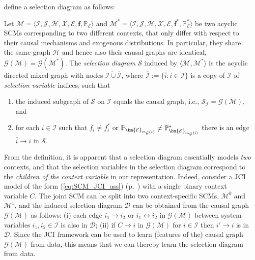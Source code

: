 \documentclass[twoside,11pt]{article}
\newcommand{\Prb}{\mathbb{P}}
\newcommand\B[1]{\bm{#1}}
\newcommand\C[1]{\mathcal{#1}}
\newcommand\BC[1]{\bm{\mathcal{#1}}}
\newcommand\mathbfsc[1]{\text{\normalfont\scshape#1}}
\newcommand\pasub[2]{\mathbfsc{pa}_{#1}(#2)}
\newcommand\eref[1]{(\ref{#1})}
\newcommand{\oto}{\leftrightarrow}
\newcommand{\Joris}[1]{{\color{blue}#1}}
\newcommand{\Tom}[1] {{\color{green}#1}}
\begin{document}
\citet{BareinboimPearl2013} define a selection diagram as follows:
\begin{definition}
Let $\C{M} = \langle \C{I}, \C{J}, \C{H}, \BC{X}, \BC{E}, \B{f}, \Prb_{\BC{E}} \rangle$ and
$\C{M}^* = \langle \C{I}, \C{J}, \C{H}, \BC{X}, \BC{E}, \B{f}^*, \Prb^*_{\BC{E}} \rangle$ be
two acyclic SCMs corresponding to two different contexts, that only differ with respect to their
causal mechanisms and exogenous distributions. In particular, they share the same 
graph $\C{H}$ and hence also their causal graphs are identical, $\C{G}(\C{M}) = \C{G}(\C{M}^*)$. 
The \emph{selection diagram} $\C{S}$ induced by $\langle \C{M}, \C{M}^*\rangle$ 
is the acyclic directed mixed graph with nodes $\C{I} \dot\cup \overline{\C{I}}$, where 
$\overline{\C{I}} := \{\bar{i} : i \in \C{I}\}$ is a copy of $\C{I}$ of \emph{selection variable} indices, such that
  \begin{enumerate}
    \item the induced subgraph of $\C{S}$ on $\C{I}$ equals the causal graph, i.e., $\C{S}_{\C{I}} = \C{G}(\C{M})$, and
    \item for each $i\in \C{I}$ such that $f_i \ne f_i^*$ or $\Prb_{\BC{E}_{\pasub{\C{G}}{i}}} \ne \Prb^*_{\BC{E}_{\pasub{\C{G}}{i}}}$ there is an edge $\bar{i} \to i$ in $\C{S}$.
  \end{enumerate}
\end{definition}

From the definition, it is apparent that a selection diagram essentially models \emph{two} contexts, and
that the selection variables in the selection diagram correspond to the \emph{children of the context variable}
in our representation.
Indeed, consider a JCI model of the form \eref{eq:SCM_JCI_ass} (p.\ \pageref{eq:SCM_JCI_ass}) with a single binary context variable $C$. The
joint SCM can be split into two context-specific SCMs, $\C{M}^0$ and $\C{M}^1$, and the induced 
selection diagram $\C{D}$ can be obtained from the causal graph $\C{G}(\C{M})$ as follows: (i) 
each edge $i_1 \to i_2$ or $i_1 \oto i_2$ in $\C{G}(\C{M})$ between system variables $i_1,i_2 \in \C{I}$ is also
in $\C{D}$; (ii) if $C \to i$ in $\C{G}(\C{M})$ for $i \in \C{I}$ then $i' \to i$ is in $\C{D}$. Since the JCI
framework can be used to learn (features of the) causal graph $\C{G}(\C{M})$ from data, this means that
we can thereby learn the selection diagram from data. 
\end{document}
